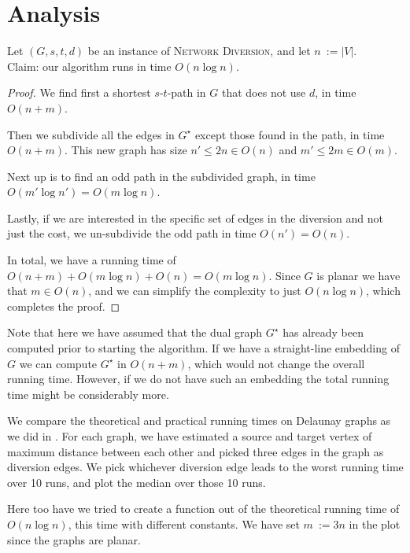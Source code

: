 \section{Analysis}

\begin{theorem}
    Let $(G, s, t, d)$ be an instance of \textsc{Network Diversion}, and let $n~:= |V|$. \\
    Claim: our algorithm runs in time $O(n \log n)$.
    
    \begin{proof}
        We find first a shortest $s$-$t$-path in $G$ that does not use $d$, in time $O(n+m)$.
    
        Then we subdivide all the edges in $G^\star$ except those found in the path, in time $O(n+m)$. This new graph has size $n' \leq 2n \in O(n)$ and $m' \leq 2m \in O(m)$.
    
        Next up is to find an odd path in the subdivided graph, in time $O(m' \log n') = O(m \log n)$.
    
        Lastly, if we are interested in the specific set of edges in the diversion and not just the cost, we un-subdivide the odd path in time $O(n') = O(n)$.
    
        In total, we have a running time of $O(n+m) + O(m \log n) + O(n) = O(m \log n)$. Since $G$ is planar we have that $m \in O(n)$, and we can simplify the complexity to just $O(n \log n)$, which completes the proof.
    \end{proof}
\end{theorem}

Note that here we have assumed that the dual graph $G^\star$ has already been computed prior to starting the algorithm. If we have a straight-line embedding of $G$ we can compute $G^\star$ in $O(n+m)$, which would not change the overall running time. However, if we do not have such an embedding the total running time might be considerably more.

We compare the theoretical and practical running times on Delaunay graphs as we did in . For each graph, we have estimated a source and target vertex of maximum distance between each other and picked three edges in the graph as diversion edges. We pick whichever diversion edge leads to the worst running time over 10 runs, and plot the median over those 10 runs.

Here too have we tried to create a function out of the theoretical running time of $O(n \log n)$, this time with different constants. We have set $m~:= 3n$ in the plot since the graphs are planar.

